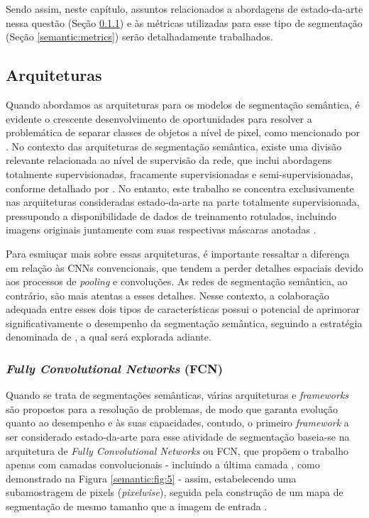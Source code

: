 Sendo assim, neste capítulo, assuntos relacionados a abordagens de estado-da-arte nessa questão (Seção \ref{semantic:FCN}) e às métricas utilizadas para esse tipo de segmentação (Seção \ref{semantic:metrics}) serão detalhadamente trabalhados.


\subsection{Arquiteturas}
\label{semantic:arch}
Quando abordamos as arquiteturas para os modelos de segmentação semântica, é evidente o crescente desenvolvimento de oportunidades para resolver a problemática de separar classes de objetos a nível de pixel, como mencionado por \citep{Guo2018ANetworksb}. No contexto das arquiteturas de segmentação semântica, existe uma divisão relevante relacionada ao nível de supervisão da rede, que inclui abordagens totalmente supervisionadas, fracamente supervisionadas e semi-supervisionadas, conforme detalhado por \citep{Hao2020ALearning}. No entanto, este trabalho se concentra exclusivamente nas arquiteturas consideradas estado-da-arte na parte totalmente supervisionada, pressupondo a disponibilidade de dados de treinamento rotulados, incluindo imagens originais juntamente com suas respectivas máscaras anotadas \citep{Hao2020ALearning}.

Para esmiuçar mais sobre essas arquiteturas, é importante ressaltar a diferença em relação às CNNs convencionais, que tendem a perder detalhes espaciais devido aos processos de \textit{pooling} e convoluções. As redes de segmentação semântica, ao contrário, são mais atentas a esses detalhes. Nesse contexto, a colaboração adequada entre esses dois tipos de características possui o potencial de aprimorar significativamente o desempenho da segmentação semântica, seguindo a estratégia denominada de , a qual será explorada adiante.

\subsubsection{\textit{Fully Convolutional Networks} (FCN)}
\label{semantic:FCN}
Quando se trata de segmentações semânticas, várias arquiteturas e \textit{frameworks} são propostos para a resolução de problemas, de modo que garanta evolução quanto ao desempenho e às suas capacidades, contudo, o primeiro \textit{framework} a ser considerado estado-da-arte para esse atividade de segmentação baseia-se na arquitetura de \textit{Fully Convolutional Networks} \citep{Shelhamer2016} ou FCN, que propõem o trabalho apenas com camadas convolucionais - incluindo a última camada \citep{Hesamian2019}, como demonstrado na Figura \ref{semantic:fig:5} - assim, estabelecendo uma subamostragem de pixels (\textit{pixelwise}), seguida pela construção de um mapa de segmentação de mesmo tamanho que a imagem de entrada \citep{Minaee2021, Zhang2018, Hesamian2019}.

